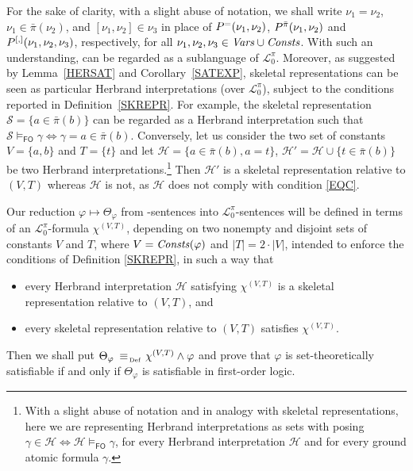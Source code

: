 \documentclass[manyauthors]{fundam}
\newcommand{\Elpizero}{\ensuremath{\mathcal{L}_{0}^{\pi}}\xspace}
\newcommand{\nonpairssym}{\bar{\pi}}
\newcommand{\nonpairs}[1]{\nonpairssym(#1)}
\newcommand{\nonpairin}[2]{#1 \in \bar{\pi}(#2)}
\newcommand{\seteq}[2]{#1=#2}
\newcommand{\atset}{\mathcal{S}}
\newcommand{\consta}{a}
\newcommand{\constb}{b}
\newcommand{\hinter}{\ensuremath{\mathcal{H}}}
\newcommand{\fomodels}[2]{#1 \models_{\mathsf{FO}} #2}
\begin{document}
For the sake of clarity, with a slight abuse of notation, we shall
write $\nu_1=\nu_2$, $\nu_1 \in \nonpairs{\nu_2}$, and $[\nu_1, \nu_2]
\in \nu_3$ in place of $P^{=}(\nu_1, \nu_2)$, $P^{\bar{\pi}}(\nu_1,
\nu_2)$ and $P^{[,]}(\nu_1, \nu_2, \nu_3)$, respectively, for all
$\nu_1,\nu_2,\nu_3 \in \mathit{Vars} \cup \mathit{Consts}$.  With such an
understanding, \Forallpizero can be regarded as a sublanguage of
$\Elpizero$. Moreover, as suggested by Lemma~\ref{HERSAT} and Corollary~\ref{SATEXP}, skeletal representations can be seen as particular Herbrand 
interpretations (over \Elpizero), subject to the conditions reported 
in Definition~\ref{SKREPR}. For example, the skeletal
representation 
$\atset=\{ \nonpairin{\consta}{\constb} \}$ can be regarded as 
a Herbrand interpretation such that $\fomodels{\atset}{\gamma} \iff
\gamma=\nonpairin{\consta}{\constb}$.  Conversely, let us consider
the two set of constants $V=\{\consta, \constb\}$ and $T=\{t\}$
and let $\hinter=\{\nonpairin{\consta}{\constb}, \seteq{\consta}{t}\}$,
$\hinter'=\hinter \cup \{\nonpairin{t}{\constb}\}$ be two
Herbrand interpretations.\footnote{With a slight abuse of notation and in
analogy with skeletal representations, here we are representing Herbrand interpretations
as sets with posing $\gamma \in \hinter \iff \fomodels{\hinter}{\gamma}$,
for every Herbrand interpretation $\hinter$ and for every ground atomic formula
$\gamma$.} Then $\hinter'$ is a skeletal representation relative to $(V,T)$
whereas $\hinter$ is not, as $\hinter$ does not comply with condition
\ref{EQC}.



Our reduction $\varphi \mapsto \Theta_{\varphi}$ from 
\Forallpizero-sentences into \Elpizero-sentences will be defined in 
terms of an \Elpizero-formula $\chi^{(V,T)}$, depending on two 
nonempty and disjoint sets of constants $V$ and $T$, where $V = 
\mathit{Consts}(\varphi)$ and $|T| = 2 \cdot |V|$, intended to enforce the 
conditions of Definition \ref{SKREPR}, in such a way that
\begin{itemize}
  \item every Herbrand interpretation $\hinter$ satisfying $\chi^{(V,T)}$
  is a skeletal representation relative to $(V,T)$, and
  \item every skeletal representation relative to $(V,T)$
  satisfies $\chi^{(V,T)}$.
\end{itemize}
Then we shall put $\Theta_{\varphi} \equivAs\, \chi^{(V,T)} \wedge 
\varphi$ and prove that $\varphi$ is set-theoretically satisfiable if 
and only if $\Theta_{\varphi}$ is satisfiable in first-order logic.
\end{document}
